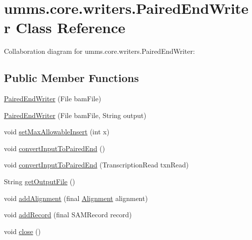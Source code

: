 \hypertarget{classumms_1_1core_1_1writers_1_1_paired_end_writer}{\section{umms.\+core.\+writers.\+Paired\+End\+Writer Class Reference}
\label{classumms_1_1core_1_1writers_1_1_paired_end_writer}
}


Collaboration diagram for umms.\+core.\+writers.\+Paired\+End\+Writer\+:
\subsection*{Public Member Functions}
\begin{DoxyCompactItemize}
\item 
\hyperlink{classumms_1_1core_1_1writers_1_1_paired_end_writer_a9dec4cc1ae7d65d0ce3d4e586db9681d}{Paired\+End\+Writer} (File bam\+File)
\item 
\hyperlink{classumms_1_1core_1_1writers_1_1_paired_end_writer_a65b3ac521ffa6cda84f27ee2e4d33e1f}{Paired\+End\+Writer} (File bam\+File, String output)
\item 
void \hyperlink{classumms_1_1core_1_1writers_1_1_paired_end_writer_af311259728eda69307c90e2c7bb01057}{set\+Max\+Allowable\+Insert} (int x)
\item 
void \hyperlink{classumms_1_1core_1_1writers_1_1_paired_end_writer_accda9db268398e2d01de77a971db2231}{convert\+Input\+To\+Paired\+End} ()
\item 
void \hyperlink{classumms_1_1core_1_1writers_1_1_paired_end_writer_a7681512eb93745733ef348dbccf184ba}{convert\+Input\+To\+Paired\+End} (Transcription\+Read txn\+Read)
\item 
String \hyperlink{classumms_1_1core_1_1writers_1_1_paired_end_writer_a5ca002632fb9f4f13cf7883b1d5fce66}{get\+Output\+File} ()
\item 
void \hyperlink{classumms_1_1core_1_1writers_1_1_paired_end_writer_a29ba6b639ded42279e167c354987710b}{add\+Alignment} (final \hyperlink{interfaceumms_1_1core_1_1alignment_1_1_alignment}{Alignment} alignment)
\item 
void \hyperlink{classumms_1_1core_1_1writers_1_1_paired_end_writer_a55e98abca6fad4207f826be2a82d8319}{add\+Record} (final S\+A\+M\+Record record)
\item 
void \hyperlink{classumms_1_1core_1_1writers_1_1_paired_end_writer_a5d5be508ea6ea765331fd61ec7ddcbdc}{close} ()
\end{DoxyCompactItemize}
